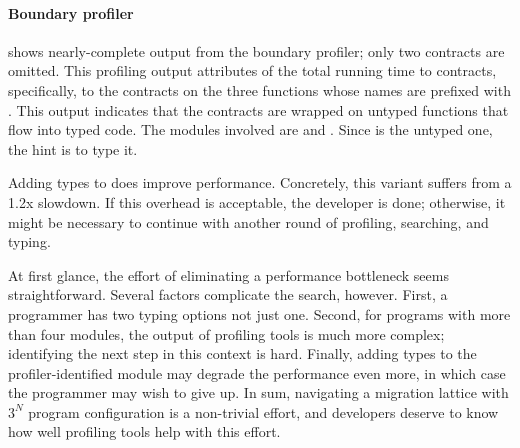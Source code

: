 \paragraph{Boundary profiler}  shows nearly-complete
output from the boundary profiler; only two contracts are omitted.  This
profiling output attributes  of the total running time to
contracts, specifically, to the contracts on the three functions whose names are
prefixed with . This output indicates that the contracts are
wrapped on untyped functions that flow into typed code. The modules involved are
 and .  Since  is the untyped one, the hint is to
type it.

Adding types to  does improve performance. Concretely, this variant
suffers from a 1.2x slowdown.  If this overhead is acceptable, the developer is
done; otherwise, it might be necessary to continue with another round of
profiling, searching, and typing.

\medskip

At first glance, the effort of eliminating a performance bottleneck seems
straightforward. Several factors complicate the search, however. First, a
programmer has two typing options not just one. Second, for programs with more
than four modules, the output of profiling tools is much more complex;
identifying the next step in this context is hard. Finally, adding types to the
profiler-identified module may degrade the performance even more, in which case
the programmer may wish to give up. In sum, navigating a migration lattice with
$3^N$ program configuration is a non-trivial effort, and developers deserve to
know how well profiling tools help with this effort. 


